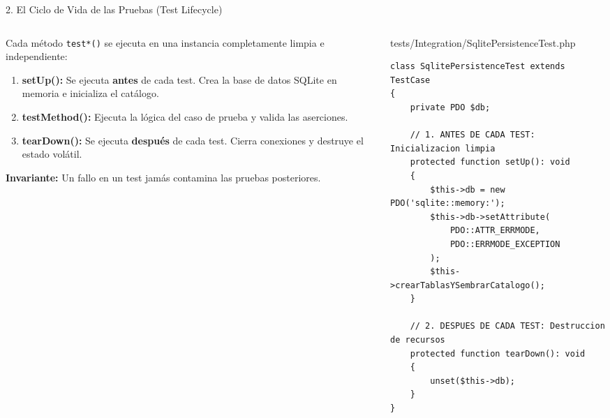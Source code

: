 \documentclass[aspectratio=169,10pt]{beamer}
\begin{document}
\begin{frame}[fragile]{2. El Ciclo de Vida de las Pruebas (Test Lifecycle)}
\begin{columns}
\begin{column}{0.48\textwidth}
    \begin{tcolorbox}[colback=cardbg, colframe=cardbg, title=\color{accentamber}\bfseries Aislamiento Atómico por Caso de Prueba]
        Cada método \texttt{test*()} se ejecuta en una instancia completamente limpia e independiente:
        \begin{enumerate}
            \item \textbf{setUp():} Se ejecuta \textbf{antes} de cada test. Crea la base de datos SQLite en memoria e inicializa el catálogo.
            \item \textbf{testMethod():} Ejecuta la lógica del caso de prueba y valida las aserciones.
            \item \textbf{tearDown():} Se ejecuta \textbf{después} de cada test. Cierra conexiones y destruye el estado volátil.
        \end{enumerate}
        \vspace{0.05cm}
        \textbf{Invariante:} Un fallo en un test jamás contamina las pruebas posteriores.
    \end{tcolorbox}
\end{column}
\begin{column}{0.52\textwidth}
    \begin{codebox}{tests/Integration/SqlitePersistenceTest.php}
\begin{lstlisting}
class SqlitePersistenceTest extends TestCase 
{
    private PDO $db;

    // 1. ANTES DE CADA TEST: Inicializacion limpia
    protected function setUp(): void 
    {
        $this->db = new PDO('sqlite::memory:');
        $this->db->setAttribute(
            PDO::ATTR_ERRMODE, 
            PDO::ERRMODE_EXCEPTION
        );
        $this->crearTablasYSembrarCatalogo();
    }

    // 2. DESPUES DE CADA TEST: Destruccion de recursos
    protected function tearDown(): void 
    {
        unset($this->db);
    }
}
\end{lstlisting}
    \end{codebox}
\end{column}
\end{columns}
\end{frame}
\end{document}
